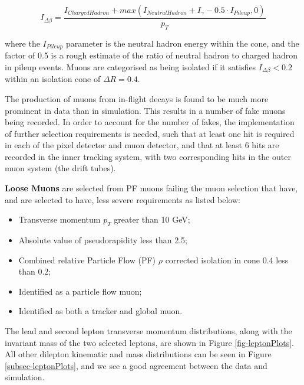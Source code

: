 \begin{equation}
I_{\Delta \beta} = \frac{I_{ChargedHadron} + max\left(I_{NeutralHadron} + I_{\gamma} - 0.5 \cdot I_{Pileup}, 0 \right)}{p_T}
\end{equation}

where the $I_{Pileup}$ parameter is the neutral hadron energy within the cone, and the factor of 0.5 is a rough estimate of the ratio of neutral hadron to charged hadron in pileup events. Muons are categorised as being isolated if it satisfies $I_{\Delta \beta} < 0.2$ within an isolation cone of $\Delta R = 0.4$. 

The production of muons from in-flight decays is found to be much more prominent in data than in simulation. This results in a number of fake muons being recorded. In order to account for the number of fakes, the implementation of further selection requirements is needed, such that at least one hit is required in each of the pixel detector and muon detector, and that at least 6 hits are recorded in the inner tracking system, with two corresponding hits in the outer muon system (the drift tubes).  

\textbf{Loose Muons} are selected from PF muons failing the muon selection that have, and are selected to have, less severe requirements as listed below:

\begin{itemize}
	\item Transverse momentum $p_T$ greater than 10 GeV;
	\item Absolute value of pseudorapidity less than 2.5;
	\item Combined relative Particle Flow (PF) $\rho$ corrected isolation in cone 0.4 less than 0.2;
	\item Identified as a particle flow muon;
	\item Identified as both a tracker and global muon.
\end{itemize}

The lead and second lepton transverse momentum distributions, along with the invariant mass of the two selected leptons, are shown in Figure \ref{fig-leptonPlots}. All other dilepton kinematic and mass distributions can be seen in Figure \ref{subsec-leptonPlots}, and we see a good agreement between the data and simulation.

